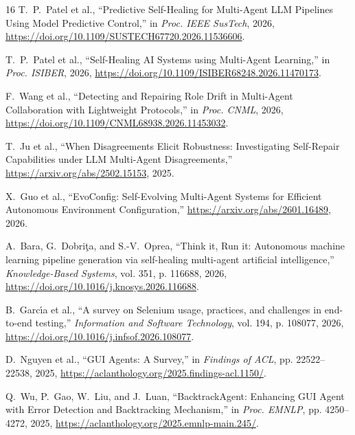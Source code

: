 \documentclass[conference]{IEEEtran}
\begin{document}
\begin{thebibliography}{16}
T.~P.~Patel et al., ``Predictive Self-Healing for Multi-Agent LLM Pipelines Using Model Predictive Control,'' in \emph{Proc. IEEE SusTech}, 2026, \url{https://doi.org/10.1109/SUSTECH67720.2026.11536606}.

T.~P.~Patel et al., ``Self-Healing AI Systems using Multi-Agent Learning,'' in \emph{Proc. ISIBER}, 2026, \url{https://doi.org/10.1109/ISIBER68248.2026.11470173}.

F.~Wang et al., ``Detecting and Repairing Role Drift in Multi-Agent Collaboration with Lightweight Protocols,'' in \emph{Proc. CNML}, 2026, \url{https://doi.org/10.1109/CNML68938.2026.11453032}.

T.~Ju et al., ``When Disagreements Elicit Robustness: Investigating Self-Repair Capabilities under LLM Multi-Agent Disagreements,'' \url{https://arxiv.org/abs/2502.15153}, 2025.

X.~Guo et al., ``EvoConfig: Self-Evolving Multi-Agent Systems for Efficient Autonomous Environment Configuration,'' \url{https://arxiv.org/abs/2601.16489}, 2026.

A.~Bara, G.~Dobri\c{t}a, and S.-V.~Oprea, ``Think it, Run it: Autonomous machine learning pipeline generation via self-healing multi-agent artificial intelligence,'' \emph{Knowledge-Based Systems}, vol. 351, p. 116688, 2026, \url{https://doi.org/10.1016/j.knosys.2026.116688}.

B.~Garc\'{\i}a et al., ``A survey on Selenium usage, practices, and challenges in end-to-end testing,'' \emph{Information and Software Technology}, vol. 194, p. 108077, 2026, \url{https://doi.org/10.1016/j.infsof.2026.108077}.

D.~Nguyen et al., ``GUI Agents: A Survey,'' in \emph{Findings of ACL}, pp. 22522--22538, 2025, \url{https://aclanthology.org/2025.findings-acl.1150/}.

Q.~Wu, P.~Gao, W.~Liu, and J.~Luan, ``BacktrackAgent: Enhancing GUI Agent with Error Detection and Backtracking Mechanism,'' in \emph{Proc. EMNLP}, pp. 4250--4272, 2025, \url{https://aclanthology.org/2025.emnlp-main.245/}.

\end{thebibliography}
\end{document}
